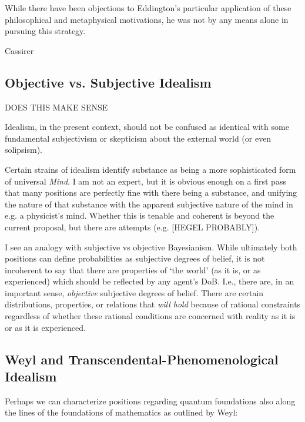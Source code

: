 While there have been objections to Eddington's particular application of these philosophical and metaphysical motivations, he was not by any means alone in pursuing this strategy.  



Cassirer

\subsection{Objective vs. Subjective Idealism}

DOES THIS MAKE SENSE

Idealism, in the present context, should not be confused as identical with some fundamental subjectivism or skepticism about the external world (or even solipsism).

Certain strains of idealism identify substance as being a more sophisticated form of universal \emph{Mind}.  I am not an expert, but it is obvious enough on a first pass that many positions are perfectly fine with there being a substance, and unifying the nature of that substance with the apparent subjective nature of the mind in e.g. a physicist's mind.  Whether this is tenable and coherent is beyond the current proposal, but there are attempts (e.g. [HEGEL PROBABLY]).

I see an analogy with subjective vs objective Bayesianism.  While ultimately both positions can define probabilities as subjective degrees of belief, it is not incoherent to say that there are properties of `the world' (as it is, or as experienced) which should be reflected by any agent's DoB.  I.e., there are, in an important sense, \emph{objective} subjective degrees of belief.  There are certain distributions, properties, or relations that \emph{will hold} because of rational constraints regardless of whether these rational conditions are concerned with reality as it is or as it is experienced.



\subsection{Weyl and Transcendental-Phenomenological Idealism}

Perhaps we can characterize positions regarding quantum foundations also along the lines of the foundations of mathematics as outlined by Weyl:

